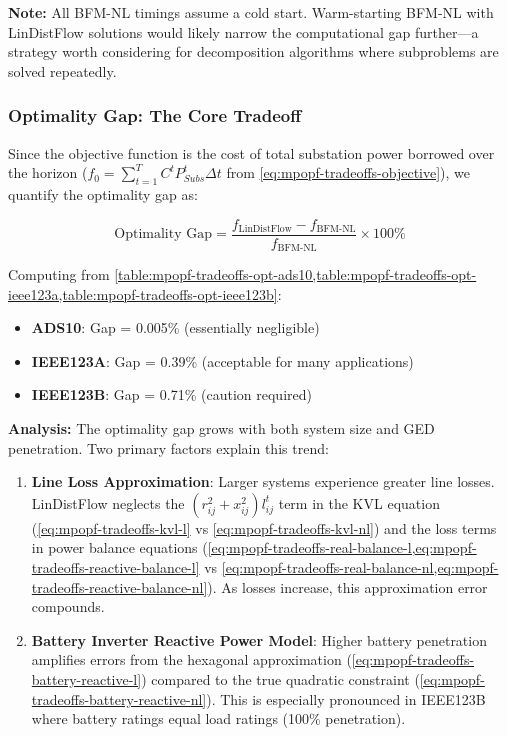 \textbf{Note:} All BFM-NL timings assume a cold start. Warm-starting BFM-NL with LinDistFlow solutions would likely narrow the computational gap further—a strategy worth considering for decomposition algorithms where subproblems are solved repeatedly.

\subsubsection{Optimality Gap: The Core Tradeoff}

Since the objective function is the cost of total substation power borrowed over the horizon (\(f_0 = \sum_{t=1}^{T} C^t P^t_{Subs} \Delta t\) from \cref{eq:mpopf-tradeoffs-objective}), we quantify the optimality gap as:

\[
\text{Optimality Gap} = \frac{f_{\text{LinDistFlow}} - f_{\text{BFM-NL}}}{f_{\text{BFM-NL}}} \times 100\%
\]

Computing from \cref{table:mpopf-tradeoffs-opt-ads10,table:mpopf-tradeoffs-opt-ieee123a,table:mpopf-tradeoffs-opt-ieee123b}:
\begin{itemize}
    \item \textbf{ADS10}: Gap = 0.005\% (essentially negligible)
    \item \textbf{IEEE123A}: Gap = 0.39\% (acceptable for many applications)
    \item \textbf{IEEE123B}: Gap = 0.71\% (caution required)
\end{itemize}

\textbf{Analysis:} The optimality gap grows with both system size and GED penetration. Two primary factors explain this trend:

\begin{enumerate}
    \item \textbf{Line Loss Approximation}: Larger systems experience greater line losses. LinDistFlow neglects the \((r_{ij}^2 + x_{ij}^2)l_{ij}^t\) term in the KVL equation (\cref{eq:mpopf-tradeoffs-kvl-l} vs \cref{eq:mpopf-tradeoffs-kvl-nl}) and the loss terms in power balance equations (\cref{eq:mpopf-tradeoffs-real-balance-l,eq:mpopf-tradeoffs-reactive-balance-l} vs \cref{eq:mpopf-tradeoffs-real-balance-nl,eq:mpopf-tradeoffs-reactive-balance-nl}). As losses increase, this approximation error compounds.
    
    \item \textbf{Battery Inverter Reactive Power Model}: Higher battery penetration amplifies errors from the hexagonal approximation (\cref{eq:mpopf-tradeoffs-battery-reactive-l}) compared to the true quadratic constraint (\cref{eq:mpopf-tradeoffs-battery-reactive-nl}). This is especially pronounced in IEEE123B where battery ratings equal load ratings (100\% penetration).
\end{enumerate}

